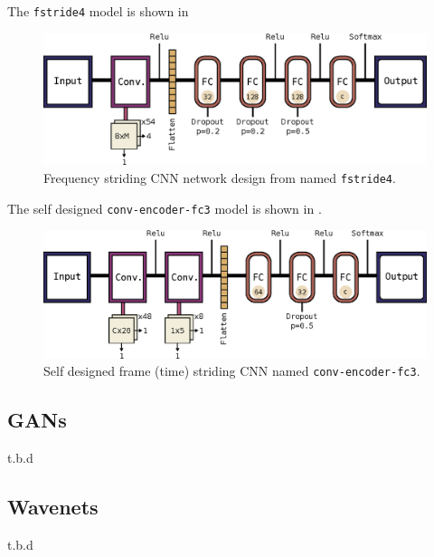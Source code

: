 The \texttt{fstride4} model is shown in 
\begin{figure}[!ht]
  \centering
    \includegraphics[height=0.2\textwidth]{./4_nn/figs/nn_arch_cnn_fstride.eps}
  \caption{Frequency striding CNN network design from \cite{Sainath2015} named \texttt{fstride4}.}
  \label{fig:nn_arch_cnn_fstride}
\end{figure}
\FloatBarrier
\noindent

The self designed \texttt{conv-encoder-fc3} model is shown in .
\begin{figure}[!ht]
  \centering
    \includegraphics[height=0.2\textwidth]{./4_nn/figs/nn_arch_cnn_conv-encoder-fc3.eps}
  \caption{Self designed frame (time) striding CNN named \texttt{conv-encoder-fc3}.}
  \label{fig:nn_arch_cnn_conv-encoder-fc3}
\end{figure}
\FloatBarrier
\noindent



\subsection{GANs}\label{sec:nn_arch_gan}
t.b.d

\subsection{Wavenets}\label{sec:nn_arch_wavenet}
t.b.d

%
%
